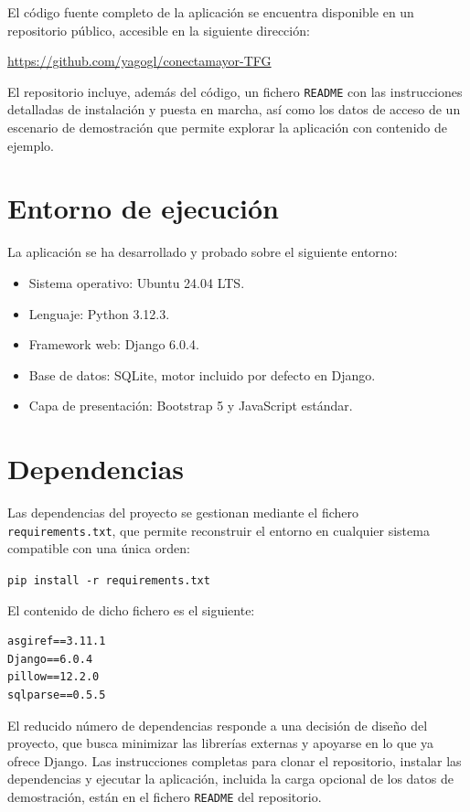 
El código fuente completo de la aplicación se encuentra disponible en un
repositorio público, accesible en la siguiente dirección:

\begin{center}
\url{https://github.com/yagogl/conectamayor-TFG}
\end{center}

El repositorio incluye, además del código, un fichero \texttt{README} con
las instrucciones detalladas de instalación y puesta en marcha, así como
los datos de acceso de un escenario de demostración que permite explorar
la aplicación con contenido de ejemplo.

\section{Entorno de ejecución\label{SEC:APP_ENTORNO}}

La aplicación se ha desarrollado y probado sobre el siguiente entorno:

\begin{itemize}
  \item Sistema operativo: Ubuntu 24.04 LTS.
  \item Lenguaje: Python 3.12.3.
  \item Framework web: Django 6.0.4.
  \item Base de datos: SQLite, motor incluido por defecto en Django.
  \item Capa de presentación: Bootstrap 5 y JavaScript estándar.
\end{itemize}

\section{Dependencias\label{SEC:APP_DEPENDENCIAS}}

Las dependencias del proyecto se gestionan mediante el fichero
\texttt{requirements.txt}, que permite reconstruir el entorno en cualquier
sistema compatible con una única orden:

\begin{center}
\texttt{pip install -r requirements.txt}
\end{center}

El contenido de dicho fichero es el siguiente:

\begin{lstlisting}[language={},basicstyle=\ttfamily\small,frame=single,numbers=none]
asgiref==3.11.1
Django==6.0.4
pillow==12.2.0
sqlparse==0.5.5
\end{lstlisting}

El reducido número de dependencias responde a una decisión de diseño del proyecto, que busca minimizar las librerías externas y apoyarse en lo que ya ofrece Django. Las instrucciones completas para clonar el repositorio, instalar las dependencias y ejecutar la aplicación, incluida la carga opcional de los datos de demostración, están en el fichero \texttt{README} del repositorio.
